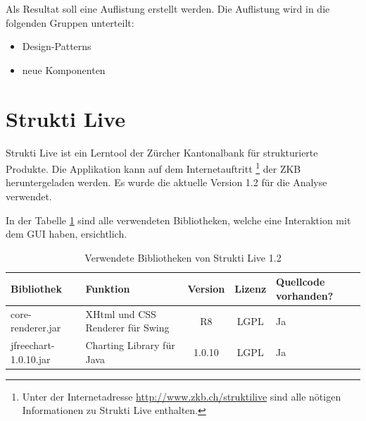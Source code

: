   Als Resultat soll eine Auflistung erstellt werden. Die Auflistung wird in die
  folgenden Gruppen unterteilt:
  
  \begin{itemize}
    \item Design-Patterns
    \item neue Komponenten
  \end{itemize}
  
  \section{Strukti Live}
  
  Strukti Live ist ein Lerntool der Zürcher Kantonalbank für strukturierte
  Produkte. Die Applikation kann auf dem Internetauftritt \footnote{Unter der
  Internetadresse \url{http://www.zkb.ch/struktilive} sind alle nötigen
  Informationen zu Strukti Live enthalten.} der \ac{ZKB} heruntergeladen
  werden. Es wurde die aktuelle Version 1.2 für die Analyse verwendet.
  
  In der Tabelle \ref{tab:bibliothekenStruktiLive} sind alle verwendeten
  Bibliotheken, welche eine Interaktion mit dem \ac{GUI} haben, ersichtlich.
  \newline
  
  \begin{table}[ht]
    \begin{center}
      \begin{tabular}{lp{4.5cm}ccp{2cm}}
        \toprule
        Bibliothek & Funktion & Version & Lizenz & Quellcode vorhanden?\\
        \midrule
        core-renderer.jar & XHtml und CSS Renderer für Swing & R8 & LGPL & Ja\\
        jfreechart-1.0.10.jar & Charting Library für Java & 1.0.10 & LGPL & Ja\\
        \bottomrule
      \end{tabular}
      \caption{Verwendete Bibliotheken von Strukti Live 1.2}
      \label{tab:bibliothekenStruktiLive}
    \end{center}
  \end{table}
  

